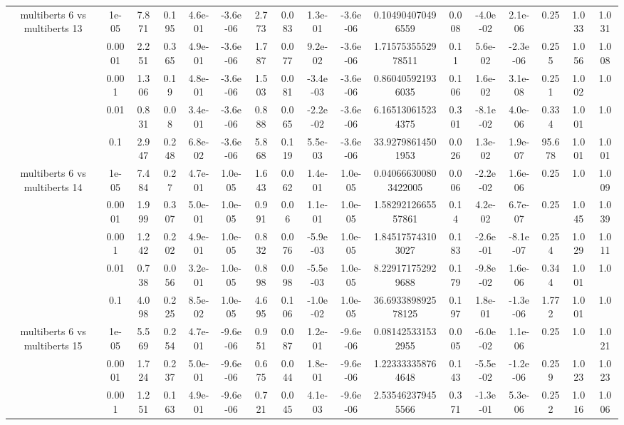 \begin{tabular}{|c|c|c|c|c|c|c|c|c|c|c|c|c|c|c|c|c|}
\hline
\multirow{5}{*}{multiberts 6 vs multiberts 13} & 1e-05 & 7.871 & 0.195 & 4.6e-01 & -3.6e-06 & 2.773 & 0.083 & 1.3e-01 & -3.6e-06 & 0.104904070496559 & 0.008 & -4.0e-02 & 2.1e-06 & 0.25 & 1.033 & 1.031 \\
 & 0.0001 & 2.251 & 0.365 & 4.9e-01 & -3.6e-06 & 1.787 & 0.077 & 9.2e-02 & -3.6e-06 & 1.7157535552978511 & 0.11 & 5.6e-02 & -2.3e-06 & 0.255 & 1.056 & 1.008 \\
 & 0.001 & 1.306 & 0.19 & 4.8e-01 & -3.6e-06 & 1.503 & 0.081 & -3.4e-03 & -3.6e-06 & 0.860405921936035 & 0.106 & 1.6e-02 & 3.1e-08 & 0.251 & 1.002 & 1.0 \\
 & 0.01 & 0.831 & 0.08 & 3.4e-01 & -3.6e-06 & 0.888 & 0.065 & -2.2e-02 & -3.6e-06 & 6.165130615234375 & 0.301 & -8.1e-02 & 4.0e-06 & 0.334 & 1.001 & 1.0 \\
 & 0.1 & 2.947 & 0.248 & 6.8e-02 & -3.6e-06 & 5.868 & 0.119 & 5.5e-03 & -3.6e-06 & 33.92798614501953 & 0.026 & 1.3e-02 & 1.9e-07 & 95.678 & 1.001 & 1.001 \\
\hline
\multirow{5}{*}{multiberts 6 vs multiberts 14} & 1e-05 & 7.484 & 0.27 & 4.7e-01 & 1.0e-05 & 1.643 & 0.062 & 1.4e-01 & 1.0e-05 & 0.040666300803422005 & 0.006 & -2.2e-02 & 1.6e-06 & 0.25 & 1.0 & 1.009 \\
 & 0.0001 & 1.999 & 0.307 & 5.0e-01 & 1.0e-05 & 0.991 & 0.06 & 1.1e-01 & 1.0e-05 & 1.5829212665557861 & 0.14 & 4.2e-02 & 6.7e-07 & 0.25 & 1.045 & 1.039 \\
 & 0.001 & 1.242 & 0.202 & 4.9e-01 & 1.0e-05 & 0.832 & 0.076 & -5.9e-03 & 1.0e-05 & 1.845175743103027 & 0.183 & -2.6e-01 & -8.1e-07 & 0.254 & 1.029 & 1.011 \\
 & 0.01 & 0.738 & 0.056 & 3.2e-01 & 1.0e-05 & 0.898 & 0.098 & -5.5e-03 & 1.0e-05 & 8.229171752929688 & 0.179 & -9.8e-02 & 1.6e-06 & 0.344 & 1.001 & 1.0 \\
 & 0.1 & 4.098 & 0.225 & 8.5e-02 & 1.0e-05 & 4.695 & 0.106 & -1.0e-02 & 1.0e-05 & 36.693389892578125 & 0.197 & 1.8e-01 & -1.3e-06 & 1.772 & 1.001 & 1.0 \\
\hline
\multirow{5}{*}{multiberts 6 vs multiberts 15} & 1e-05 & 5.569 & 0.254 & 4.7e-01 & -9.6e-06 & 0.951 & 0.087 & 1.2e-01 & -9.6e-06 & 0.081425331532955 & 0.005 & -6.0e-02 & 1.1e-06 & 0.25 & 1.0 & 1.021 \\
 & 0.0001 & 1.724 & 0.237 & 5.0e-01 & -9.6e-06 & 0.675 & 0.044 & 1.8e-01 & -9.6e-06 & 1.223333358764648 & 0.143 & -5.5e-02 & -1.2e-06 & 0.259 & 1.023 & 1.023 \\
 & 0.001 & 1.251 & 0.163 & 4.9e-01 & -9.6e-06 & 0.721 & 0.045 & 4.1e-03 & -9.6e-06 & 2.535462379455566 & 0.371 & -1.3e-01 & 5.3e-06 & 0.252 & 1.016 & 1.006 \\

\end{tabular}
